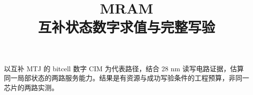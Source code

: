 \documentclass[11pt,a4paper,fontset=fandol]{ctexart}
\title{\bfseries MRAM\\[4pt]\large 互补状态数字求值与完整写验}
\author{}\date{}
\begin{document}
\maketitle\vspace{-1.8em}
\noindent 以互补 MTJ 的 bitcell 数字 CIM 为代表路径，结合 28 nm 读写电路证据，估算同一局部状态的两路服务能力。结果是有资源与成功写验条件的工程预算，非同一芯片的两路实测。

\end{document}
